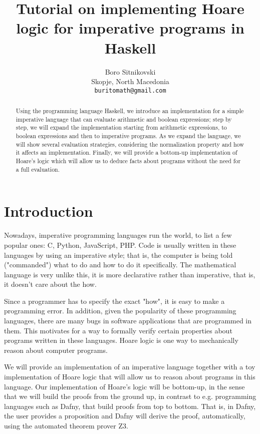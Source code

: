 \documentclass{article}
\title{Tutorial on implementing Hoare logic for imperative programs in Haskell}
\author{
  Boro Sitnikovski \\
  Skopje, North Macedonia \\
  \texttt{buritomath@gmail.com} \\
}
\theoremstyle{definition}
\begin{document}
\maketitle

\begin{abstract}
Using the programming language Haskell, we introduce an implementation for a simple imperative language that can evaluate arithmetic and boolean expressions; step by step, we will expand the implementation starting from arithmetic expressions, to boolean expressions and then to imperative programs. As we expand the language, we will show several evaluation strategies, considering the normalization property and how it affects an implementation. Finally, we will provide a bottom-up implementation of Hoare's logic which will allow us to deduce facts about programs without the need for a full evaluation.
\end{abstract}


\section{Introduction}

Nowadays, imperative programming languages run the world, to list a few popular ones: C, Python, JavaScript, PHP. Code is usually written in these languages by using an imperative style; that is, the computer is being told ("commanded") what to do and how to do it specifically. The mathematical language is very unlike this, it is more declarative rather than imperative, that is, it doesn't care about the how.

Since a programmer has to specify the exact "how", it is easy to make a programming error. In addition, given the popularity of these programming languages, there are many bugs in software applications that are programmed in them. This motivates for a way to formally verify certain properties about programs written in these languages. Hoare logic is one way to mechanically reason about computer programs.

We will provide an implementation of an imperative language together with a toy implementation of Hoare logic that will allow us to reason about programs in this language. Our implementation of Hoare's logic will be bottom-up, in the sense that we will build the proofs from the ground up, in contrast to e.g. programming languages such as Dafny\cite{b1}, that build proofs from top to bottom. That is, in Dafny, the user provides a proposition and Dafny will derive the proof, automatically, using the automated theorem prover Z3\cite{b2}.
\end{document}
